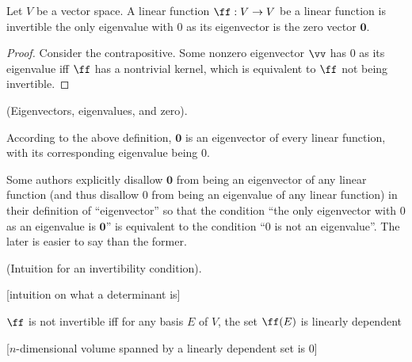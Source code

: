 \begin{theorem}
    Let $V$ be a vector space. A linear function $\ff:V \rightarrow V$ be a linear function is invertible the only eigenvalue with $0$ as its eigenvector is the zero vector $\mathbf{0}$.
\end{theorem}

\begin{proof}
   Consider the contrapositive. Some nonzero eigenvector $\vv$ has $0$ as its eigenvalue iff $\ff$ has a nontrivial kernel, which is equivalent to $\ff$ not being invertible.
\end{proof}

\begin{remark}
    (Eigenvectors, eigenvalues, and zero).
    
    According to the above definition, $\mathbf{0}$ is an eigenvector of every linear function, with its corresponding eigenvalue being $0$. 
    
    Some authors explicitly disallow $\mathbf{0}$ from being an eigenvector of any linear function (and thus disallow $0$ from being an eigenvalue of any linear function) in their definition of ``eigenvector'' so that the condition ``the only eigenvector with $0$ as an eigenvalue is $\mathbf{0}$'' is equivalent to the condition ``$0$ is not an eigenvalue''. The later is easier to say than the former.
\end{remark}

\begin{theorem}
    (Intuition for an invertibility condition).
    
    [intuition on what a determinant is]
    
    $\ff$ is not invertible iff for any basis $E$ of $V$, the set $\ff(E)$ is linearly dependent

    [$n$-dimensional volume spanned by a linearly dependent set is $0$]
\end{theorem}

